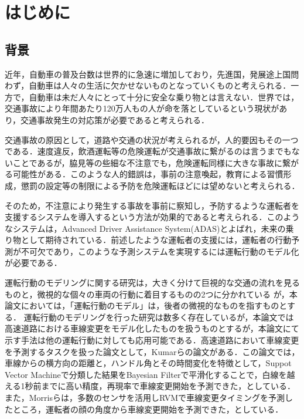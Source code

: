 \chapter{はじめに}
\section{背景}
近年，自動車の普及台数は世界的に急速に増加\cite{who}しており，先進国，発展途上国問わず，自動車は人々の生活に欠かせないものとなっていくものと考えられる．一方で，自動車は未だ人々にとって十分に安全な乗り物とは言えない．世界では，交通事故により年間あたり120万人もの人が命を落としているという現状があり\cite{who}，交通事故発生の対応策が必要であると考えられる．
\par
交通事故の原因として，道路や交通の状況が考えられるが，人的要因もその一つである．速度違反，飲酒運転等の危険運転が交通事故に繋がるのは言うまでもないことであるが，脇見等の些細な不注意でも，危険運転同様に大きな事故に繋がる可能性がある．このような人的錯誤は，事前の注意喚起，教育による習慣形成，懲罰の設定等の制限による予防を危険運転ほどには望めないと考えられる．
\par
そのため，不注意により発生する事故を事前に察知し，予防するような運転者を支援するシステムを導入するという方法が効果的であると考えられる．このようなシステムは，Advanced Driver Assistance System(ADAS)とよばれ，未来の乗り物として期待されている．前述したような運転者の支援には，運転者の行動予測が不可欠であり，このような予測システムを実現するには運転行動のモデル化が必要である．
\par
運転行動のモデリングに関する研究は，大きく分けて巨視的な交通の流れを見るものと，微視的な個々の車両の行動に着目するものの2つに分かれている
\cite{flow}
が，本論文においては，「運転行動のモデル」は，後者の微視的なものを指すものとする．
運転行動のモデリングを行った研究は数多く存在しているが，本論文では高速道路における車線変更をモデル化したものを扱うものとするが，本論文にて示す手法は他の運転行動に対しても応用可能である．高速道路において車線変更を予測するタスクを扱った論文として，Kumar\cite{kumar}らの論文がある．この論文では，車線からの横方向の距離と，ハンドル角とその時間変化を特徴として，Suppot Vector Machineで分類した結果をBayesian Filterで平滑化することで，白線を越える1秒前までに高い精度，再現率で車線変更開始を予測できた，としている．また，Morris\cite{morris}らは，多数のセンサを活用しRVMで車線変更タイミングを予測したところ，運転者の顔の角度から車線変更開始を予測できた，としている．
\par
